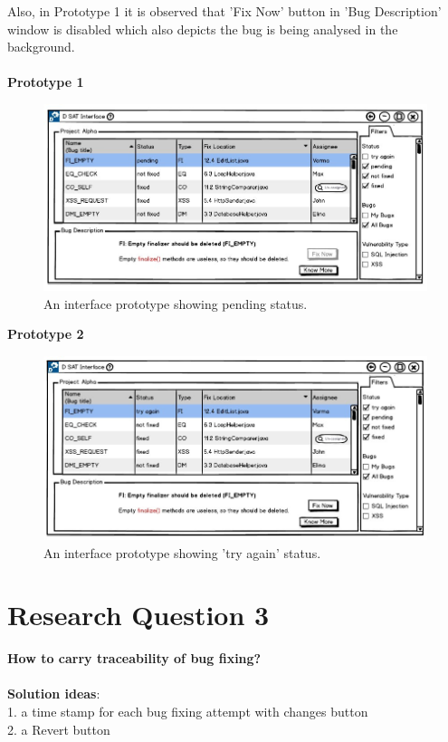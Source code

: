 Also, in Prototype 1 it is observed that 'Fix Now' button in 'Bug Description' window is disabled which also depicts the bug is being analysed in the background. \\ \\

\textbf{Prototype 1}

\begin{figure}[hbt!]
	\centering
	\includegraphics[width=\linewidth]{figures/d_pending}
	\caption{An interface prototype showing pending status.}
	\label{fig:d_pending}
\end{figure}

\textbf{Prototype 2}

\begin{figure}[hbt!]
	\centering
	\includegraphics[width=\linewidth]{figures/d_tryagain}
	\caption{An interface prototype showing 'try again' status.}
	\label{fig:d_tryagain}
\end{figure}

\section{Research Question 3} 

\textbf{ How to carry traceability of bug fixing?}
\\ \\
\textbf{Solution ideas}: \\
1. a time stamp for each bug fixing attempt with changes button \\
2. a Revert button \\ \\

